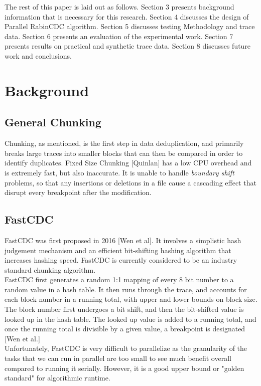 \documentclass{acmtog} %
\begin{document}
		The rest of this paper is laid out as follows. Section 3 presents background information that is necessary for this research. Section 4 discusses the design of Parallel RabinCDC algorithm. Section 5 discusses testing Methodology and trace data. Section 6 presents an evaluation of the experimental work. Section 7 presents results on practical and synthetic trace data. Section 8 discusses future work and conclusions.
		
	\section{Background}
	\subsection{General Chunking}
	Chunking, as mentioned, is the first step in data deduplication, and primarily breaks large traces into smaller blocks that can then be compared in order to identify duplicates. Fixed Size Chunking [Quinlan] has a low CPU overhead and is extremely fast, but also inaccurate. It is unable to handle \textit{boundary shift} problems, so that any insertions or deletions in a file cause a cascading effect that disrupt every breakpoint after the modification. 

	\subsection{FastCDC}

	FastCDC was first proposed in 2016 [Wen et al]. It involves a simplistic hash judgement mechanism and an efficient bit-shifting hashing algorithm that increases hashing speed. FastCDC is currently considered to be an industry standard chunking algorithm. \\
	
	FastCDC first generates a random 1:1 mapping of every 8 bit number to a random value in a hash table. It then runs through the trace, and accounts for each block number in a running total, with upper and lower bounds on block size. The block number first undergoes a bit shift, and then the bit-shifted value is looked up in the hash table. The looked up value is added to a running total, and once the running total is divisible by a given value, a breakpoint is designated [Wen et al.]\\
	
	Unfortunately, FastCDC is very difficult to parallelize as the granularity of the tasks that we can run in parallel are too small to see much benefit overall compared to running it serially. However, it is a good upper bound or "golden standard" for algorithmic runtime. 
	
\end{document}
